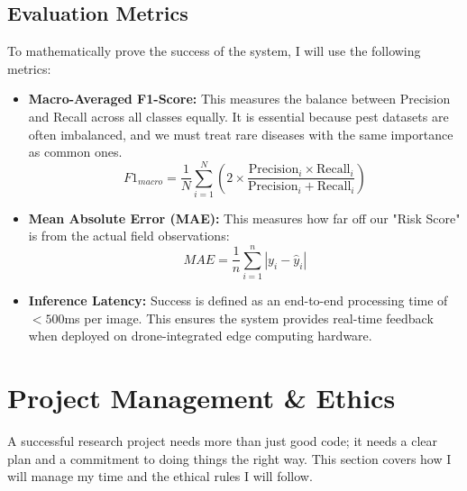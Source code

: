 \documentclass[12pt,a4paper]{article}
\begin{document}
\subsection{Evaluation Metrics}
To mathematically prove the success of the system, I will use the following metrics:
\begin{itemize}
    \item \textbf{Macro-Averaged F1-Score:} This measures the balance between Precision and Recall across all classes equally. It is essential because pest datasets are often imbalanced, and we must treat rare diseases with the same importance as common ones.
    \begin{equation}
        F1_{macro} = \frac{1}{N} \sum_{i=1}^{N} \left( 2 \times \frac{\text{Precision}_i \times \text{Recall}_i}{\text{Precision}_i + \text{Recall}_i} \right)
    \end{equation}
    
    \item \textbf{Mean Absolute Error (MAE):} This measures how far off our "Risk Score" is from the actual field observations:
    \begin{equation}
        MAE = \frac{1}{n} \sum_{i=1}^{n} |y_i - \hat{y}_i|
    \end{equation}
    
    \item \textbf{Inference Latency:} Success is defined as an end-to-end processing time of $< 500$ms per image. This ensures the system provides real-time feedback when deployed on drone-integrated edge computing hardware.
\end{itemize}

\section{Project Management \& Ethics}

A successful research project needs more than just good code; it needs a clear plan and a commitment to doing things the right way. This section covers how I will manage my time and the ethical rules I will follow.
\end{document}
